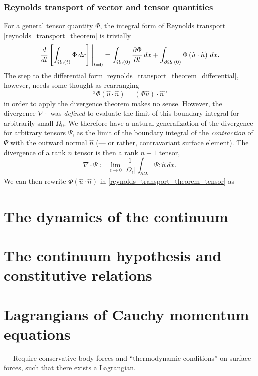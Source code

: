 \documentclass[11pt,a4paper]{memoir}
\newcommand{\Part}[2]{\frac{\partial #1}{\partial #2}}
\begin{document}
\subsubsection{Reynolds transport of vector and tensor quantities}
For a general tensor quantity $\Phi$, the integral form of Reynolds transport \eqref{reynolds_transport_theorem} is trivially
\begin{equation}\label{reynolds_transport_theorem_tensor}
    \eval{\frac{d}{dt}\left[\int_{\Omega_0(t)}\Phi\,dx\right]}_{t=0} =
        \int_{\Omega_0(0)}\Part{\Phi}{t}\,dx + \int_{\partial\Omega_0(0)}\Phi \left(\hat{u}\cdot\hat{n}\right) \,dx.
\end{equation}
The step to the differential form \eqref{reynolds_transport_theorem_differential}, however, needs some thought
as rearranging
    $$\text{``}\Phi\left(\hat{u}\cdot \hat{n}\right) = (\Phi\hat{u})\cdot \hat{n}\text{''}$$
in order to apply the divergence theorem makes no sense. However, the divergence $\nabla \cdot$ was \textit{defined}
to evaluate the limit of this boundary integral for arbitrarily small $\Omega_0$. We therefore have a natural generalization of the
divergence for arbitrary tensors $\Psi$, as the limit of the boundary integral of the \textit{contraction} of $\Psi$ with the outward normal
$\hat{n}$ (--- or rather, contravariant surface element). The divergence of a rank $n$ tensor is then a rank $n-1$ tensor,
\begin{equation}\label{tensor_divergence}
    \nabla\cdot\Psi \coloneqq
        \lim_{\epsilon \rightarrow 0} \frac{1}{\lvert \Omega_{\epsilon} \rvert}
        \int_{\partial\Omega_{\epsilon}} \Psi : \hat{n}\,dx.
\end{equation}
We can then rewrite $\Phi \left(\hat{u}\cdot \hat{n}\right)$ in \eqref{reynolds_transport_theorem_tensor} as
    $$


\section{The dynamics of the continuum} %
\section{The continuum hypothesis and constitutive relations} %
\section{Lagrangians of Cauchy momentum equations} %
--- Require conservative body forces and ``thermodynamic conditions'' on surface forces, such that there exists a Lagrangian.
\end{document}
